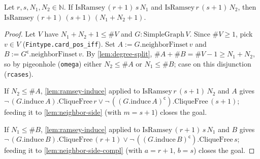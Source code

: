\begin{lemma}
    \label{lem:step}
    \leanok
    Let $r, s, N_1, N_2 \in \mathbb{N}$. If $\mathrm{IsRamsey}\,(r{+}1)\, s\, N_1$
    and $\mathrm{IsRamsey}\, r\,(s{+}1)\, N_2$, then
    $\mathrm{IsRamsey}\,(r{+}1)\,(s{+}1)\,(N_1 + N_2 + 1)$.
\end{lemma}
\begin{proof}
    Let $V$ have $N_1 + N_2 + 1 \le \#V$ and $G : \mathrm{SimpleGraph}\, V$. Since
    $\#V \ge 1$, pick $v \in V$ (\texttt{Fintype.card\_pos\_iff}). Set
    $A := G.\mathrm{neighborFinset}\, v$ and $B := G^{\mathsf c}.\mathrm{neighborFinset}\, v$.
    By \cref{lem:degree-split}, $\#A + \#B = \#V - 1 \ge N_1 + N_2$, so by
    pigeonhole (\texttt{omega}) either $N_2 \le \#A$ or $N_1 \le \#B$; case on this
    disjunction (\texttt{rcases}).

    If $N_2 \le \#A$, \cref{lem:ramsey-induce} applied to
    $\mathrm{IsRamsey}\, r\,(s{+}1)\, N_2$ and $A$ gives
    $\neg\,(G.\mathrm{induce}\, A).\mathrm{CliqueFree}\, r \lor
    \neg\,((G.\mathrm{induce}\, A)^{\mathsf c}).\mathrm{CliqueFree}\,(s{+}1)$;
    feeding it to \cref{lem:neighbor-side} (with $m = s{+}1$) closes the goal.

    If $N_1 \le \#B$, \cref{lem:ramsey-induce} applied to
    $\mathrm{IsRamsey}\,(r{+}1)\, s\, N_1$ and $B$ gives
    $\neg\,(G.\mathrm{induce}\, B).\mathrm{CliqueFree}\,(r{+}1) \lor
    \neg\,((G.\mathrm{induce}\, B)^{\mathsf c}).\mathrm{CliqueFree}\, s$;
    feeding it to \cref{lem:neighbor-side-compl} (with $a = r{+}1$, $b = s$) closes
    the goal.
\end{proof}

